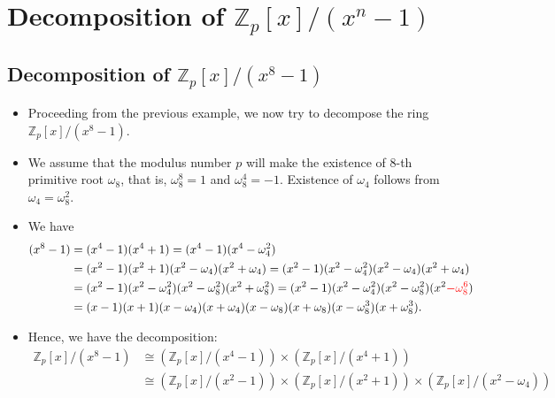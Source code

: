 \section{Decomposition of \( \mathbb{Z}_{p}[x]/(x^{n}-1) \)}
\subsection{Decomposition of \( \mathbb{Z}_{p}[x]/(x^{8}-1) \)}
\begin{frame}
    \begin{itemize}
        \item <1->Proceeding from the previous example, we now try to decompose the ring 
            \( \mathbb{Z}_{p}[x]/(x^{8}-1) \).
        \item <2->We assume that the modulus number \( p \) will make the existence of 
            8-th primitive root \( \omega_{8} \), that is, \( \omega_{8}^{8} = 1 \) and
            \( \omega_{8}^{4} =  -1 \). 
            Existence of \( \omega_{4} \) follows from \( \omega_{4} = \omega_{8}^{2} \).
        \item <3->We have
            \begin{align*}
                (x^{8}-1) &= (x^{4}-1)(x^{4}+1) = (x^{4} -1)(x^{4} - \omega_{4}^{2})\\
                          &= (x^{2}-1)(x^{2}+1)(x^{2} - \omega_{4})(x^{2} + \omega_{4})
                           = (x^{2}-1)  (x^{2}-\omega_{4}^{2})  (x^{2} - \omega_{4})(x^{2} + \omega_{4})\\
                          &= (x^{2}-1)(x^{2} - \omega_{4}^{2})(x^{2} - \omega_{8}^{2})(x^{2} + \omega_{8}^{2})
                          = (x^{2}-1)(x^{2} - \omega_{4}^{2})(x^{2} - \omega_{8}^{2})(x^{2} {\color{red}- \omega_{8}^{6}})\\
                          &= (x - 1)(x + 1)
                             (x - \omega_{4})(x + \omega_{4})
                             (x - \omega_{8})(x + \omega_{8})
                             (x - \omega_{8}^{3})(x + \omega_{8}^{3}).
            \end{align*}
        \item <4->Hence, we have the decomposition:
\begin{align*}
\mathbb{Z}_{p}[x]/(x^{8}-1)
&\cong (\mathbb{Z}_{p}[x]/(x^{4}-1))
        \times
        (\mathbb{Z}_{p}[x]/(x^{4}+1)) \\[6pt]
&\cong (\mathbb{Z}_{p}[x]/(x^{2}-1))
        \times
        (\mathbb{Z}_{p}[x]/(x^{2}+1))
        \times
        (\mathbb{Z}_{p}[x]/(x^{2}-\omega_{4}))

\end{align*}
\end{itemize}
\end{frame}
